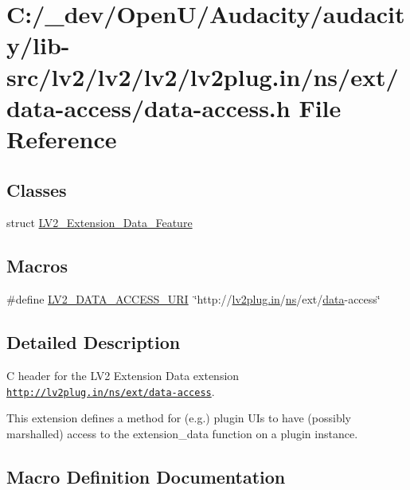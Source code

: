 \hypertarget{data-access_8h}{}\section{C\+:/\+\_\+dev/\+Open\+U/\+Audacity/audacity/lib-\/src/lv2/lv2/lv2/lv2plug.in/ns/ext/data-\/access/data-\/access.h File Reference}
\label{data-access_8h}
\subsection*{Classes}
\begin{DoxyCompactItemize}
\item 
struct \hyperlink{struct_l_v2___extension___data___feature}{L\+V2\+\_\+\+Extension\+\_\+\+Data\+\_\+\+Feature}
\end{DoxyCompactItemize}
\subsection*{Macros}
\begin{DoxyCompactItemize}
\item 
\#define \hyperlink{data-access_8h_af799dc9396bb1181aa026df724b662a2}{L\+V2\+\_\+\+D\+A\+T\+A\+\_\+\+A\+C\+C\+E\+S\+S\+\_\+\+U\+RI}~\char`\"{}http\+://\hyperlink{latency_8c_a7d946209d777cb95fe30364b8d321207}{lv2plug.\+in}/\hyperlink{xmltok_8c_ab6aec1346fb6c7b2733f0f73c9536ad2}{ns}/ext/\hyperlink{lib_2expat_8h_ac39e72a1de1cb50dbdc54b08d0432a24}{data}-\/access\char`\"{}
\end{DoxyCompactItemize}


\subsection{Detailed Description}
C header for the L\+V2 Extension Data extension \href{http://lv2plug.in/ns/ext/data-access}{\tt http\+://lv2plug.\+in/ns/ext/data-\/access}.

This extension defines a method for (e.\+g.) plugin U\+Is to have (possibly marshalled) access to the extension\+\_\+data function on a plugin instance. 

\subsection{Macro Definition Documentation}
